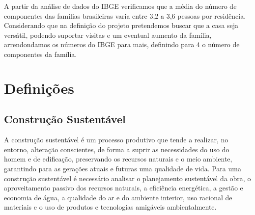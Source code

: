 	A partir da análise de dados do IBGE\cite{2010IBGE} verificamos que a média do número de componentes das famílias brasileiras varia entre 3,2 a 3,6 pessoas por residência. Considerando que na definição do projeto pretendemos buscar que a casa seja versátil, podendo suportar visitas e um eventual aumento da família, arrendondamos os números do IBGE\cite{2010IBGE} para mais, definindo para 4 o número de componentes da família. 

\section{Definições}

\subsection{Construção Sustentável}
	
	A construção sustentável é um processo produtivo que tende a realizar, no entorno, alteração conscientes, de forma a suprir as necessidades do uso do homem e de edificação, preservando os recursos naturais e o meio ambiente, garantindo para as gerações atuais e futuras uma qualidade de vida\cite{1992Baroni}. Para uma construção sustentável é necessário analisar o planejamento sustentável da obra, o aproveitamento passivo dos recursos naturais, a eficiência energética, a gestão e economia de água, a qualidade do ar e do ambiente interior, uso racional de materiais e o uso de produtos e tecnologias amigáveis ambientalmente\cite{2012Araujo}.






















































